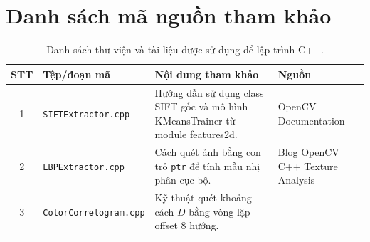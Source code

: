 \chapter{Danh sách mã nguồn tham khảo}

\begin{table}[H]
\centering
\begin{tabularx}{\textwidth}{|c|l|X|X|}
\hline
\textbf{STT} & \textbf{Tệp/đoạn mã} & \textbf{Nội dung tham khảo} & \textbf{Nguồn} \\
\hline
1 & \texttt{SIFTExtractor.cpp} & Hướng dẫn sử dụng class SIFT gốc và mô hình KMeansTrainer từ module features2d. & OpenCV Documentation \cite{opencv_docs} \\
\hline
2 & \texttt{LBPExtractor.cpp} & Cách quét ảnh bằng con trỏ \texttt{ptr} để tính mẫu nhị phân cục bộ. & Blog OpenCV C++ Texture Analysis \\
\hline
3 & \texttt{ColorCorrelogram.cpp} & Kỹ thuật quét khoảng cách $D$ bằng vòng lặp offset 8 hướng. & \cite{huang1997image} \\
\hline
\end{tabularx}
\caption{Danh sách thư viện và tài liệu được sử dụng để lập trình C++.}
\end{table}
